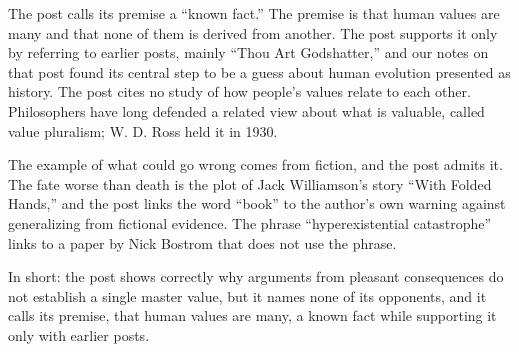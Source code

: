 \begin{afterword}
The post calls its premise a ``known fact.'' The premise is that human values are many and that none of them is derived from another. The post supports it only by referring to earlier posts, mainly ``Thou Art Godshatter,'' and our notes on that post found its central step to be a guess about human evolution presented as history. The post cites no study of how people's values relate to each other. Philosophers have long defended a related view about what is valuable, called value pluralism; W. D. Ross held it in 1930.

The example of what could go wrong comes from fiction, and the post admits it. The fate worse than death is the plot of Jack Williamson's story ``With Folded Hands,'' and the post links the word ``book'' to the author's own warning against generalizing from fictional evidence. The phrase ``hyperexistential catastrophe'' links to a paper by Nick Bostrom that does not use the phrase.

In short: the post shows correctly why arguments from pleasant consequences do not establish a single master value, but it names none of its opponents, and it calls its premise, that human values are many, a known fact while supporting it only with earlier posts.
\end{afterword}
